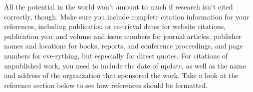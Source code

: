 \documentclass[mnsc,blindrev]{informs3} %
\begin{document}
All the potential in the world won't amount to much if research
isn't cited correctly, though. Make sure you include complete
citation information for your references, including publication or
re-trieval dates for website citations, publication year and volume
and issue numbers for journal articles, publisher names and
locations for books, reports, and conference proceedings, and page
numbers for eve-rything, but especially for direct quotes. For
citations of unpublished work, you need to include the date of
update, as well as the name and address of the organization that
sponsored the work. Take a look at the reference section below to
see how references should be formatted.


%
%
%









\end{document}
